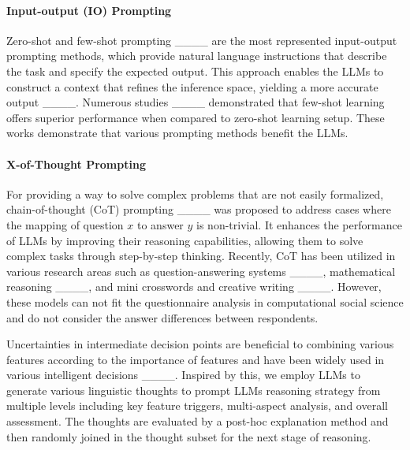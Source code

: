 \paragraph{Input-output (IO) Prompting}

Zero-shot and few-shot prompting ____ are the most represented input-output prompting methods, which provide natural language instructions that describe the task and specify the expected output. This approach enables the LLMs to construct a context that refines the inference space, yielding a more accurate output ____. Numerous studies ____ demonstrated that few-shot learning offers superior performance when compared to zero-shot learning setup. These works demonstrate that various prompting methods benefit the LLMs.

\paragraph{X-of-Thought Prompting}

For providing a way to solve complex problems that are not easily formalized, chain-of-thought (CoT) prompting ____ was proposed to address cases where the mapping of question $x$ to answer $y$ is non-trivial. It enhances the performance of LLMs by improving their reasoning capabilities, allowing them to solve complex tasks through step-by-step thinking. Recently, CoT has been utilized in various research areas such as question-answering systems ____, mathematical reasoning ____, and mini crosswords and creative writing ____. However, these models can not fit the questionnaire analysis in computational social science and do not consider the answer differences between respondents. 

Uncertainties in intermediate decision points are beneficial to combining various features according to the importance of features and have been widely used in various intelligent decisions ____. Inspired by this, we employ LLMs to generate various linguistic thoughts to prompt LLMs reasoning strategy from multiple levels including key feature triggers, multi-aspect analysis, and overall assessment. The thoughts are evaluated by a post-hoc explanation method and then randomly joined in the thought subset for the next stage of reasoning.